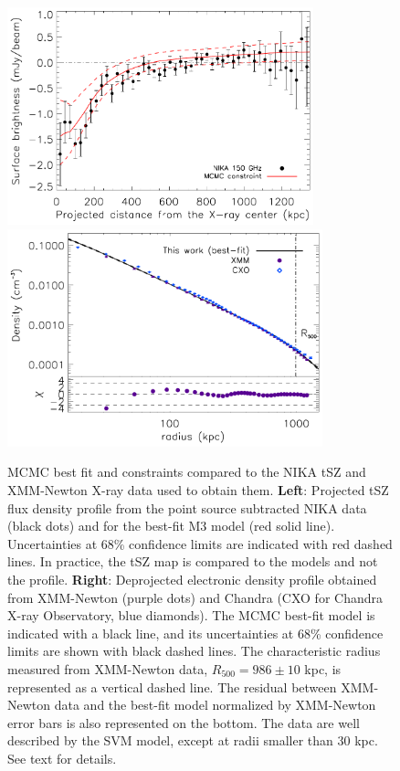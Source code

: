 \documentclass[traditabstract]{aa}
\begin{document}
\begin{figure}[h]
\centering
\includegraphics[height=6.3cm]{Figure/MACSJ1424_profile_ML.pdf}
\includegraphics[height=6.3cm]{Figure/ICM_density_profile.pdf}
\caption{\footnotesize MCMC best fit and constraints compared to the NIKA tSZ and XMM-Newton X-ray data used to obtain them. {\bf Left}: Projected tSZ flux density profile from the point source subtracted NIKA data (black dots) and for the best-fit M3 model (red solid line). Uncertainties at 68\% confidence limits are indicated with red dashed lines. In practice,  the tSZ map  is compared to the models and not the profile. {\bf Right}: Deprojected electronic density profile obtained from XMM-Newton (purple dots) and Chandra (CXO for Chandra X-ray Observatory, blue diamonds). The MCMC best-fit model is indicated with a black line, and its uncertainties at 68\% confidence limits are shown with  black dashed lines. The characteristic radius measured from XMM-Newton data, $R_{500} = 986 \pm 10$ kpc, is represented as a vertical dashed line. The residual between XMM-Newton data and the best-fit model normalized by XMM-Newton error bars is also represented on the bottom. The data are well described by the SVM model, except at radii smaller than 30 kpc. See text for details.}
\label{fig:MACSJ1424_MCMC_vs_data}
\end{figure}
\end{document}
